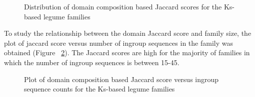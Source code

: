 \documentclass{article}
\begin{document}
		\begin{figure}
			\caption{Distribution of domain composition based Jaccard scores for the Ks-based legume families}
			\label{fig:hist_domain_jaccard_scores_lgf5}
		\end{figure}
		
		To study the relationship between the domain Jaccard score and family size, the plot of jaccard score versus number of ingroup sequences in the family was obtained (Figure ~\ref{fig:scatter_domain_jaccard_vs_seq_ct_lgf5}). The Jaccard scores are high for the majority of families in which the number of ingroup sequences is between 15-45.
		
		\begin{figure}
			\caption{Plot of domain composition based Jaccard score versus ingroup sequence counts for the Ks-based legume families}
			\label{fig:scatter_domain_jaccard_vs_seq_ct_lgf5}
		\end{figure}
		
\end{document}
